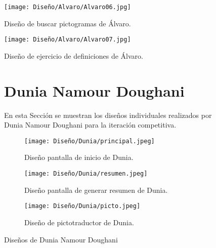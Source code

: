 \begin{figure}[ht!]
  \centering
  \texttt{[image: Diseño/Alvaro/Alvaro06.jpg]}
  \caption{Diseño de buscar pictogramas de Álvaro.}
  \label{fig:disenyoAlvaro05}
\end{figure}

\begin{figure}[ht!]
  \centering
  \texttt{[image: Diseño/Alvaro/Alvaro07.jpg]}
  \caption{Diseño de ejercicio de definiciones de Álvaro.}
  \label{fig:disenyoAlvaro06}
\end{figure}

\begin{figure}[ht!]
  \section{Dunia Namour Doughani}
  En esta Sección se muestran los diseños individuales realizados por Dunia Namour Doughani para la iteración competitiva.
  \label{sec:disenyoDunia}
  \begin{subfigure}{\textwidth}
    \centering
    \texttt{[image: Diseño/Dunia/principal.jpeg]}
    \caption{Diseño pantalla de inicio de Dunia.}
    \label{dunia1}
  \end{subfigure}

  \begin{subfigure}{\textwidth}
    \centering
    \texttt{[image: Diseño/Dunia/resumen.jpeg]}
    \caption{Diseño pantalla de generar resumen de Dunia.}
    \label{dunia2}
  \end{subfigure}

  \begin{subfigure}{\textwidth}
    \centering
    \texttt{[image: Diseño/Dunia/picto.jpeg]}
    \caption{Diseño de pictotraductor de Dunia.}
    \label{dunia3}
  \end{subfigure}

  \caption{Diseños de Dunia Namour Doughani}
  \label{fig:disenyoDunia}
\end{figure}

